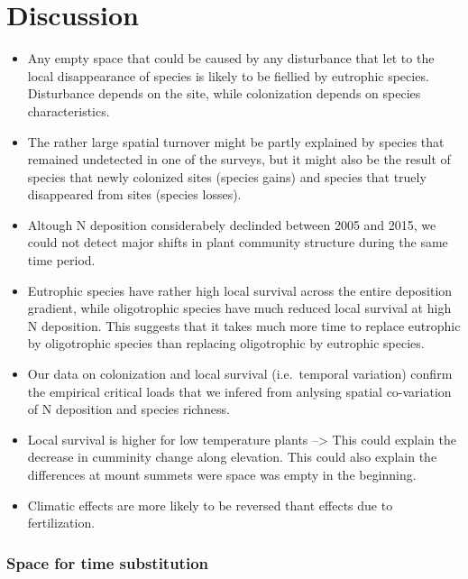 \documentclass[fleqn,10pt,lineno]{wlpeerj} %
\theoremstyle{definition}
\theoremstyle{definition}
\theoremstyle{definition}
\theoremstyle{remark}
\begin{document}
\section*{Discussion}\label{discussion}

\begin{itemize}
\item
  Any empty space that could be caused by any disturbance that let to
  the local disappearance of species is likely to be fiellied by
  eutrophic species. Disturbance depends on the site, while colonization
  depends on species characteristics.
\item
  The rather large spatial turnover might be partly explained by species
  that remained undetected in one of the surveys, but it might also be
  the result of species that newly colonized sites (species gains) and
  species that truely disappeared from sites (species losses).
\item
  Altough N deposition considerabely declinded between 2005 and 2015, we
  could not detect major shifts in plant community structure during the
  same time period.
\item
  Eutrophic species have rather high local survival across the entire
  deposition gradient, while oligotrophic species have much reduced
  local survival at high N deposition. This suggests that it takes much
  more time to replace eutrophic by oligotrophic species than replacing
  oligotrophic by eutrophic species.
\item
  Our data on colonization and local survival (i.e.~temporal variation)
  confirm the empirical critical loads that we infered from anlysing
  spatial co-variation of N deposition and species richness.
\item
  Local survival is higher for low temperature plants --\textgreater{}
  This could explain the decrease in cumminity change along elevation.
  This could also explain the differences at mount summets were space
  was empty in the beginning.
\item
  Climatic effects are more likely to be reversed thant effects due to
  fertilization.
\end{itemize}

\subsubsection{Space for time
substitution}\label{space-for-time-substitution}
\end{document}
